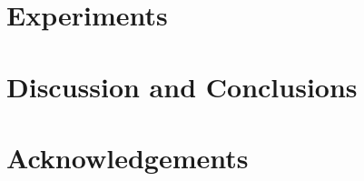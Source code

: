 \documentclass[conference]{IEEEtran}
\begin{document}
	\section{Experiments}
	\label{sec:experiment}
	
	
	\section{Discussion and Conclusions}
	\label{sec:conclusion}
	
	
	\section*{Acknowledgements}
	\label{sec:acknowledgement}
	
	
\end{document}
